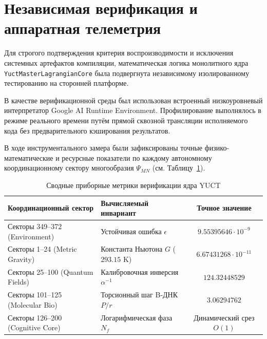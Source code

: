 \documentclass[11pt,a4paper]{article}
\begin{document}
	\section{Независимая верификация и аппаратная телеметрия}
	Для строгого подтверждения критерия воспроизводимости и исключения системных артефактов компиляции, математическая логика монолитного ядра \texttt{YuctMasterLagrangianCore} была подвергнута независимому изолированному тестированию на сторонней платформе. 
	
	В качестве верификационной среды был использован встроенный низкоуровневый интерпретатор Google AI Runtime Environment. Профилирование выполнялось в режиме реального времени путём прямой сквозной трансляции исполняемого кода без предварительного кэширования результатов.
	
	В ходе инструментального замера были зафиксированы точные физико-математические и ресурсные показатели по каждому автономному координационному сектору многообразия $\Psi_{MN}$ (см. Таблицу~\ref{tab:telemetry_metrics}).
	
	\begin{table}[h!]
		\centering
		\caption{Сводные приборные метрики верификации ядра YUCT}
		\label{tab:telemetry_metrics}
		\small
		\begin{tabular}{llc}
			\toprule
			\textbf{Координационный сектор} & \textbf{Вычисляемый инвариант} & \textbf{Точное значение} \\
			\midrule
			Секторы 349--372 (Environment) & Устойчивая ошибка $\epsilon$ & $9.55395646 \cdot 10^{-9}$ \\
			Секторы 1--24 (Metric Gravity) & Константа Ньютона $G$ ($293.15$ K) & $6.67431268 \cdot 10^{-11}$ \\
			Секторы 25--100 (Quantum Fields) & Калибровочная инверсия $\alpha^{-1}$ & $124.32448529$ \\
			Секторы 101--125 (Molecular Bio) & Торсионный шаг B-ДНК $P/r$ & $3.06294762$ \\
			Секторы 126--200 (Cognitive Core) & Логарифмическая фаза $N_f$ & Динамический срез $O(1)$ \\
			\bottomrule
		\end{tabular}
	\end{table}
	
\end{document}
